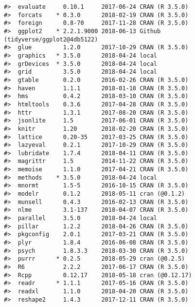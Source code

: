\documentclass[]{book}
\theoremstyle{definition}
\theoremstyle{definition}
\theoremstyle{definition}
\theoremstyle{remark}
\begin{document}
\begin{verbatim}
#>  evaluate     0.10.1     2017-06-24 CRAN (R 3.5.0)                    
#>  forcats    * 0.3.0      2018-02-19 CRAN (R 3.5.0)                    
#>  foreign      0.8-70     2017-11-28 CRAN (R 3.5.0)                    
#>  ggplot2    * 2.2.1.9000 2018-06-13 Github (tidyverse/ggplot2@4db5122)
#>  glue         1.2.0      2017-10-29 CRAN (R 3.5.0)                    
#>  graphics   * 3.5.0      2018-04-24 local                             
#>  grDevices  * 3.5.0      2018-04-24 local                             
#>  grid         3.5.0      2018-04-24 local                             
#>  gtable       0.2.0      2016-02-26 CRAN (R 3.5.0)                    
#>  haven        1.1.1      2018-01-18 CRAN (R 3.5.0)                    
#>  hms          0.4.2      2018-03-10 CRAN (R 3.5.0)                    
#>  htmltools    0.3.6      2017-04-28 CRAN (R 3.5.0)                    
#>  httr         1.3.1      2017-08-20 CRAN (R 3.5.0)                    
#>  jsonlite     1.5        2017-06-01 CRAN (R 3.5.0)                    
#>  knitr        1.20       2018-02-20 CRAN (R 3.5.0)                    
#>  lattice      0.20-35    2017-03-25 CRAN (R 3.5.0)                    
#>  lazyeval     0.2.1      2017-10-29 CRAN (R 3.5.0)                    
#>  lubridate    1.7.4      2018-04-11 CRAN (R 3.5.0)                    
#>  magrittr     1.5        2014-11-22 CRAN (R 3.5.0)                    
#>  memoise      1.1.0      2017-04-21 CRAN (R 3.5.0)                    
#>  methods    * 3.5.0      2018-04-24 local                             
#>  mnormt       1.5-5      2016-10-15 CRAN (R 3.5.0)                    
#>  modelr       0.1.2      2018-05-11 cran (@0.1.2)                     
#>  munsell      0.4.3      2016-02-13 CRAN (R 3.5.0)                    
#>  nlme         3.1-137    2018-04-07 CRAN (R 3.5.0)                    
#>  parallel     3.5.0      2018-04-24 local                             
#>  pillar       1.2.2      2018-04-26 CRAN (R 3.5.0)                    
#>  pkgconfig    2.0.1      2017-03-21 CRAN (R 3.5.0)                    
#>  plyr         1.8.4      2016-06-08 CRAN (R 3.5.0)                    
#>  psych        1.8.3.3    2018-03-30 CRAN (R 3.5.0)                    
#>  purrr      * 0.2.5      2018-05-29 cran (@0.2.5)                     
#>  R6           2.2.2      2017-06-17 CRAN (R 3.5.0)                    
#>  Rcpp         0.12.17    2018-05-18 cran (@0.12.17)                   
#>  readr      * 1.1.1      2017-05-16 CRAN (R 3.5.0)                    
#>  readxl       1.1.0      2018-04-20 CRAN (R 3.5.0)                    
#>  reshape2     1.4.3      2017-12-11 CRAN (R 3.5.0)                    

\end{verbatim}
\end{document}
